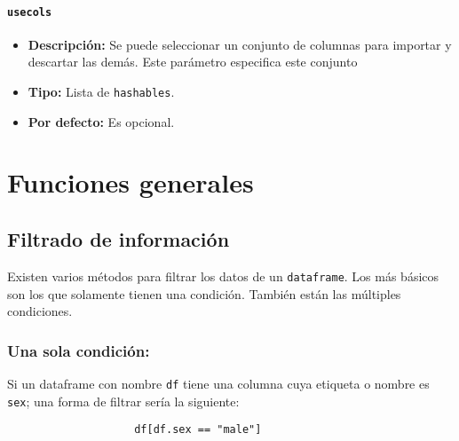                 \paragraph{\texttt{usecols}}

                    \begin{itemize}
                        \item \textbf{Descripción:} Se puede seleccionar un conjunto de columnas para importar y descartar las demás. Este parámetro especifica este conjunto
                        \item \textbf{Tipo:} Lista de \texttt{hashables}.
                        \item \textbf{Por defecto:} Es opcional.
                    \end{itemize}





    \section{Funciones generales}

        \subsection{Filtrado de información}

            Existen varios métodos para filtrar los datos de un \texttt{dataframe}. Los más básicos son los que solamente tienen una condición. También están las múltiples condiciones.

            \subsubsection{Una sola condición:} Si un dataframe con nombre \texttt{df} tiene una columna cuya etiqueta o nombre es \texttt{sex}; una forma de filtrar sería la siguiente:

                \begin{verbatim}
                    df[df.sex == "male"]
                \end{verbatim}

